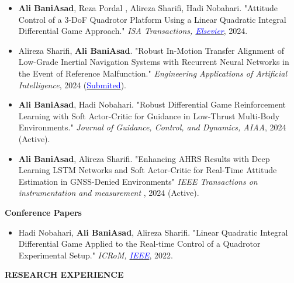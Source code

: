 \documentclass[12pt]{article}
\begin{document}
\begin{itemize} \itemsep -2pt %
	\item \textbf{Ali BaniAsad}, Reza Pordal , Alireza Sharifi, Hadi Nobahari. "Attitude Control of a 3-DoF Quadrotor Platform Using a Linear Quadratic Integral Differential Game Approach." \textit{ISA Transactions,
        \href{https://doi.org/10.1016/j.isatra.2024.03.005}{\textcolor{blue}{Elsevier}}}, 2024.
	\item Alireza Sharifi, \textbf{Ali BaniAsad}. "Robust In-Motion Transfer Alignment of Low-Grade Inertial Navigation Systems with Recurrent Neural Networks in the Event of Reference Malfunction." \textit{Engineering Applications of Artificial Intelligence}, 2024
	(\href{https://drive.google.com/file/d/19qd1IjmCQMv2Alldh55oYQSTPr03vjJL/view?usp=sharing}{\textcolor{blue}{Submited}}).
	\item \textbf{Ali BaniAsad}, Hadi Nobahari. "Robust Differential Game Reinforcement Learning with Soft Actor-Critic for Guidance in Low-Thrust Multi-Body Environments." \textit{Journal of Guidance, Control, and Dynamics,
	AIAA}, 2024 (Active).
	\item \textbf{Ali BaniAsad}, Alireza Sharifi. "Enhancing AHRS Results with Deep Learning LSTM Networks and Soft Actor-Critic for Real-Time Attitude Estimation in GNSS-Denied Environments"
	\textit{IEEE Transactions on instrumentation and measurement
}, 2024 (Active).
\end{itemize}

\vspace{0.2in} %
\noindent
{\bfseries Conference Papers}

\vspace{6pt}
\begin{itemize} \itemsep -2pt %
	\item Hadi Nobahari,  \textbf{Ali BaniAsad}, Alireza Sharifi. "Linear Quadratic Integral Differential Game Applied to the Real-time Control of a Quadrotor Experimental Setup." \textit{ICRoM, \href{https://doi.org/10.1109/ICRoM57054.2022.10025263}{\textcolor{blue}{IEEE}}}, 2022.
\end{itemize}

\vspace{0.2in} %


\vspace{-4pt}
\begin{center}
	{\noindent \bfseries RESEARCH EXPERIENCE} %
\end{center}
\end{document}
